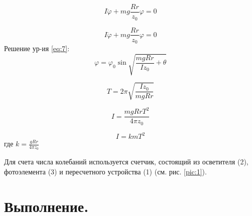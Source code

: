 \documentclass[a4paper,12pt]{article} %
\begin{document}
\begin{equation}
  I \ddot{\varphi} + mg \frac{Rr}{z_0} \varphi = 0
  \label{eq:7}
\end{equation}

\begin{equation}
  I \ddot{\varphi} + mg \frac{Rr}{z_0} \varphi = 0
  \label{eq:7}
\end{equation}
Решение ур-ия \eqref{eq:7}:
\begin{equation}
  \varphi = \varphi_0 \sin{\sqrt{\frac{mgRr}{Iz_0} + \theta}}
  \label{eq:8}
\end{equation}

\begin{equation}
  T = 2\pi\sqrt{\frac{Iz_0}{mgRr}}
  \label{eq:9}
\end{equation}

\begin{equation}
  I = \frac{mgRrT^2}{4\pi z_0}
  \label{eq:9}
\end{equation}

\begin{equation}
  I = kmT^2
  \label{eq:9}
\end{equation}
где $k = \frac{gRr}{4\pi z_0}$

Для счета числа колебаний используется счетчик, состоящий из осветителя (2), фотоэлемента (3) и пересчетного устройства (1) (см.
рис. \ref{pic:1}).

\section{Выполнение.}
\end{document}
